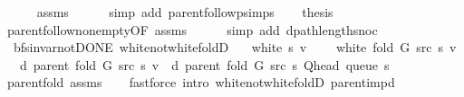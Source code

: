 \begin{isabellebody}
\ \ \ \ \isamarkupfalse%
\ assms\isanewline
\ \ \ \ \isamarkupfalse%
\ {\isacharparenleft}{\kern0pt}simp\ add{\isacharcolon}{\kern0pt}\ parent{\isachardot}{\kern0pt}follow{\isacharunderscore}{\kern0pt}psimps{\isacharparenright}{\kern0pt}\isanewline
\ \ \isamarkupfalse%
\ {\isacharquery}{\kern0pt}thesis\isanewline
\ \ \ \ \isamarkupfalse%
\ parent{\isachardot}{\kern0pt}follow{\isacharunderscore}{\kern0pt}non{\isacharunderscore}{\kern0pt}empty{\isacharbrackleft}{\kern0pt}OF\ assms{\isacharparenleft}{\kern0pt}{}{\isacharparenright}{\kern0pt}{\isacharbrackright}{\kern0pt}\isanewline
\ \ \ \ \isamarkupfalse%
\ {\isacharparenleft}{\kern0pt}simp\ add{\isacharcolon}{\kern0pt}\ dpath{\isacharunderscore}{\kern0pt}length{\isacharunderscore}{\kern0pt}snoc{\isacharparenright}{\kern0pt}\isanewline
{}\isamarkupfalse%
%
\endisatagproof
{\isafoldproof}%
%
\isadelimproof
\isanewline
%
\endisadelimproof
\isanewline
{}\isamarkupfalse%
\ {\isacharparenleft}{\kern0pt}\ bfs{\isacharunderscore}{\kern0pt}invar{\isacharunderscore}{\kern0pt}not{\isacharunderscore}{\kern0pt}DONE{\isacharparenright}{\kern0pt}\ white{\isacharunderscore}{\kern0pt}not{\isacharunderscore}{\kern0pt}white{\isacharunderscore}{\kern0pt}foldD{\isacharunderscore}{\kern0pt}{}{\isacharcolon}{\kern0pt}\isanewline
\ \ \ {\isachardoublequoteopen}white\ s\ v{\isachardoublequoteclose}\isanewline
\ \ \ {\isachardoublequoteopen}{\isasymnot}\ white\ {\isacharparenleft}{\kern0pt}fold\ G\ src\ s{\isacharparenright}{\kern0pt}\ v{\isachardoublequoteclose}\isanewline
\ \ \ {\isachardoublequoteopen}d\ {\isacharparenleft}{\kern0pt}parent\ {\isacharparenleft}{\kern0pt}fold\ G\ src\ s{\isacharparenright}{\kern0pt}{\isacharparenright}{\kern0pt}\ v\ {\isacharequal}{\kern0pt}\ d\ {\isacharparenleft}{\kern0pt}parent\ {\isacharparenleft}{\kern0pt}fold\ G\ src\ s{\isacharparenright}{\kern0pt}{\isacharparenright}{\kern0pt}\ {\isacharparenleft}{\kern0pt}Q{\isacharunderscore}{\kern0pt}head\ {\isacharparenleft}{\kern0pt}queue\ s{\isacharparenright}{\kern0pt}{\isacharparenright}{\kern0pt}\ {\isacharplus}{\kern0pt}\ {}{\isachardoublequoteclose}\isanewline
%
\isadelimproof
\ \ %
\endisadelimproof
%
\isatagproof
{}\isamarkupfalse%
\ parent{\isacharunderscore}{\kern0pt}fold\ assms\isanewline
\ \ \isamarkupfalse%
\ {\isacharparenleft}{\kern0pt}fastforce\ intro{\isacharcolon}{\kern0pt}\ white{\isacharunderscore}{\kern0pt}not{\isacharunderscore}{\kern0pt}white{\isacharunderscore}{\kern0pt}foldD{\isacharparenleft}{\kern0pt}{}{\isacharparenright}{\kern0pt}\ parent{\isacharunderscore}{\kern0pt}imp{\isacharunderscore}{\kern0pt}d{\isacharparenright}{\kern0pt}%

\end{isabellebody}
